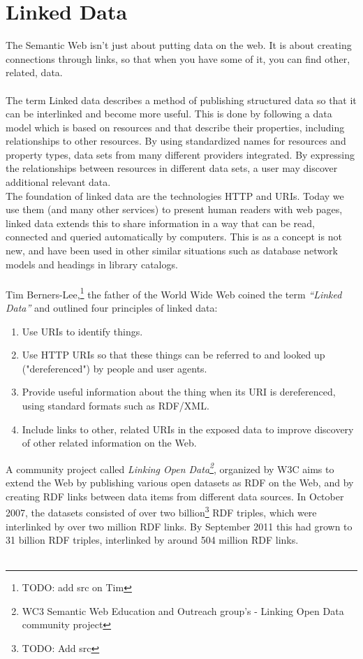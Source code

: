 \section{Linked Data}
The Semantic Web isn't just about putting data on the web. It is about creating connections through links, so that when you have some of it, you can find other, related, data.\\\\
The term Linked data describes a method of publishing structured data so that it can be interlinked and become more useful. This is done by following a data model which is based on resources and that describe their properties, including relationships to other resources. By using standardized names for resources and property types, data sets from many different providers integrated. By expressing the relationships between resources in different data sets, a user may discover additional relevant data.\\
The foundation of linked data are the technologies HTTP and URIs. Today we use them (and many other services) to present human readers with web pages, linked data extends this to share information in a way that can be read, connected and queried automatically by computers. This is as a concept is not new, and have been used in other similar situations such as database network models and headings in library catalogs.\\\\
Tim Berners-Lee,\footnote{TODO: add src on Tim} the father of the World Wide Web coined the term \textit{“Linked Data”} and outlined four principles of linked data:
\begin{enumerate}
\item{Use URIs to identify things.}
\item{Use HTTP URIs so that these things can be referred to and looked up ("dereferenced") by people and user agents.}
\item{Provide useful information about the thing when its URI is dereferenced, using standard formats such as RDF/XML.}
\item{Include links to other, related URIs in the exposed data to improve discovery of other related information on the Web.}
\end{enumerate}
A community project called \textit{Linking Open Data\footnote{WC3 Semantic Web Education and Outreach group's - Linking Open Data community project}}, organized by W3C aims to extend the Web by publishing various open datasets as RDF on the Web, and by creating RDF links between data items from different data sources. In October 2007, the datasets consisted of over two billion\footnote{TODO: Add src} RDF triples, which were interlinked by over two million RDF links. By September 2011 this had grown to 31 billion RDF triples, interlinked by around 504 million RDF links.\\\\
